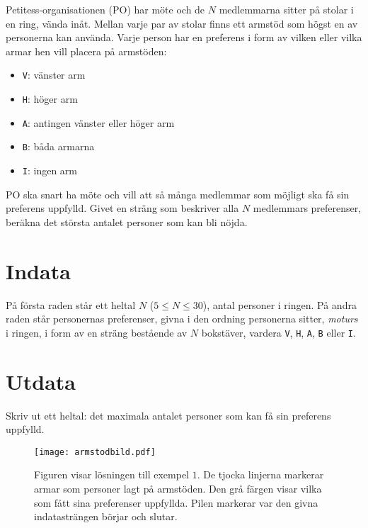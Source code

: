 
Petitess-organisationen (PO) har möte och de $N$ medlemmarna sitter på
stolar i en ring, vända inåt. Mellan varje par av stolar finns ett armstöd som högst en av personerna kan använda. Varje person har en preferens i form av vilken eller vilka armar hen vill placera på armstöden:
\begin{itemize}
\item \texttt{V}: vänster arm
\item \texttt{H}: höger arm
\item \texttt{A}: antingen vänster eller höger arm
\item \texttt{B}: båda armarna
\item \texttt{I}: ingen arm
\end{itemize}

PO ska snart ha möte och vill att så många medlemmar som möjligt ska få sin preferens uppfylld. Givet en sträng som beskriver alla $N$ medlemmars preferenser, beräkna det största antalet personer som kan bli nöjda.

\section*{Indata}
På första raden står ett heltal $N$ ($5\le N \le 30$), antal personer i ringen. På andra raden står personernas preferenser, givna i den ordning
personerna sitter, {\em moturs} i ringen, i form av en
sträng bestående av $N$ bokstäver, vardera \texttt{V}, \texttt{H},
\texttt{A}, \texttt{B} eller \texttt{I}. 

\section*{Utdata}
Skriv ut ett heltal: det maximala antalet personer som kan få sin preferens uppfylld.

\begin{figure}[!htb]
\begin{center}
\texttt{[image: armstodbild.pdf]}
\end{center}
\caption{Figuren visar lösningen till exempel $1$. De tjocka linjerna markerar
armar som personer lagt på armstöden. Den grå färgen visar vilka som fått sina preferenser uppfyllda. Pilen markerar var den givna
indatasträngen börjar och slutar.}
\end{figure}

